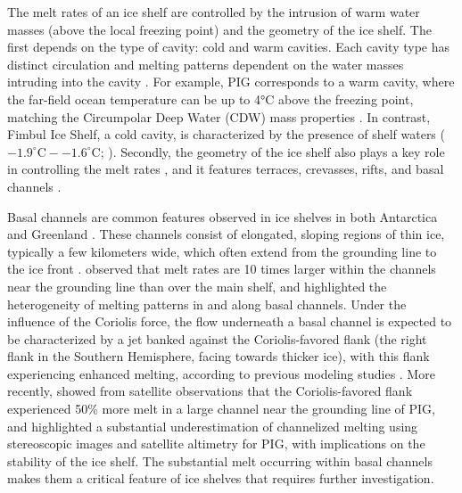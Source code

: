 \documentclass[draft]{agujournal2019}
\begin{document}
The melt rates of an ice shelf are controlled by the intrusion of warm water masses (above the local freezing point) and the geometry of the ice shelf. The first depends on the type of cavity: cold and warm cavities. Each cavity type has distinct circulation and melting  patterns dependent on the water masses intruding into the cavity \citep{Si_Antarctic_2024, Hyogo_Ocean_2024, Jourdain_Ocean_2017}. For example, PIG corresponds to a warm cavity, where the far-field ocean temperature can be up to 4°C above the freezing point, matching the Circumpolar Deep Water (CDW) mass properties \citep{Jacobs_Stronger_2011}. In contrast, Fimbul Ice Shelf, a cold cavity, is characterized by the presence of shelf waters ($-1.9^\circ \mathrm{C} - -1.6^\circ \mathrm{C}$; \citealt{Hattermann_Fimbul_2012}). Secondly, the geometry of the ice shelf also plays a key role in controlling the melt rates \citep{Little_IceShelf_2009}, and it features terraces, crevasses, rifts, and basal channels \citep{Rosevear_Shelves_2025}. 

Basal channels are common features observed in ice shelves in both Antarctica and Greenland \citep{Zinck_channelized_2026, Ally_channel_2024, Wahlin_Swirls_2024, Zeising_Greenland_2024, Rignot_Channelized_2008}. These channels consist of elongated, sloping regions of thin ice, typically a few kilometers wide, which often extend from the grounding line to the ice front \citep{Dutrieux_PineIsland_2013}. 
\citet{Shean_IceShelf_2019} observed that melt rates are 10 times larger within the channels near the grounding line than over the main shelf, and highlighted the heterogeneity of melting patterns in and along basal channels. Under the influence of the Coriolis force, the flow underneath a basal channel is expected to be characterized by a jet banked against the Coriolis-favored flank (the right flank in the Southern Hemisphere, facing towards thicker ice), with this flank experiencing enhanced melting, according to previous modeling studies \citep{Cheng_Channel_2024, Millgate_BasalChannels_2013, Gladish_basal_2012}. More recently, \citet{Lowery_PIG_2025} showed from satellite observations that the Coriolis-favored flank experienced 50\% more melt in a large channel near the grounding line of PIG, and \citet{Zinck_channelized_2026} highlighted a substantial underestimation of channelized melting using stereoscopic images and satellite altimetry for PIG, with implications on the stability of the ice shelf. The substantial melt occurring within basal channels makes them a critical feature of ice shelves that requires further investigation.
\end{document}
